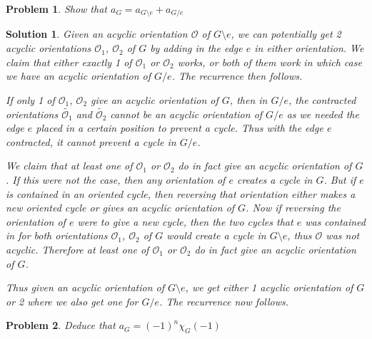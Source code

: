 \documentclass{article}
\theoremstyle{normal}
\newtheorem{problem}{Problem}
\theoremstyle{thmit}
\newtheorem*{solution}{Solution}
\begin{document}
    \begin{problem}
        Show that $a_G = a_{G\setminus{e}} + a_{G/e}$
    \end{problem}
    \begin{solution}
        Given an acyclic orientation $\mathcal{O}$ of $G\setminus{e}$, we can potentially get 2 acyclic
        orientations $\mathcal{O}_1$, $\mathcal{O}_2$ of $G$ by adding in the edge $e$ in either
        orientation. We claim that either exactly 1 of $\mathcal{O}_1$ or $\mathcal{O}_2$ works, or
        both of them work in which case we have an acyclic orientation of $G/e$. The recurrence then
        follows.
        \par
        If only 1 of $\mathcal{O}_1$, $\mathcal{O}_2$ give an acyclic orientation of $G$, then in $G/e$, the
        contracted orientations $\widetilde{\mathcal{O}_1}$ and $\widetilde{\mathcal{O}_2}$ cannot be an acyclic
        orientation of $G/e$ as we needed the edge $e$ placed in a certain position to prevent a cycle. Thus
        with the edge $e$ contracted, it cannot prevent a cycle in $G/e$.
        \par
        We claim that at least one of $\mathcal{O}_1$ or $\mathcal{O}_2$ do in fact give an acyclic
        orientation of $G$. If this were not the case, then any orientation of $e$ creates a cycle in $G$.
        But if $e$ is contained in an oriented cycle, then reversing that orientation either makes a new
        oriented cycle or gives an acyclic orientation of $G$. Now if reversing the orientation of $e$ were
        to give a new cycle, then the two cycles that $e$ was contained in for both orientations
        $\mathcal{O}_1$, $\mathcal{O}_2$ of $G$ would create a cycle in $G\setminus{e}$, thus
        $\mathcal{O}$ was not acyclic. Therefore at least one of $\mathcal{O}_1$ or $\mathcal{O}_2$ do in
        fact give an acyclic orientation of $G$.
        \par
        Thus given an acyclic orientation of $G\setminus{e}$, we get either 1 acyclic orientation of $G$ or
        2 where we also get one for $G/e$. The recurrence now follows.
    \end{solution}
    \begin{problem}
        Deduce that $a_G = (-1)^n \chi_G(-1)$
    \end{problem}
\end{document}
